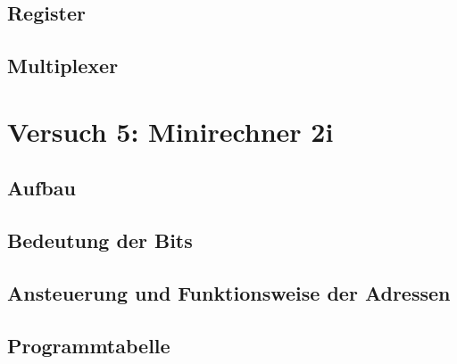 \documentclass[paper=a4, fontsize=11pt]{scrartcl}
\numberwithin{equation}{section}
\numberwithin{figure}{section}
\numberwithin{table}{section}
\begin{document}

\subsection{Register}


\subsection{Multiplexer}


\newpage

\section{Versuch 5: Minirechner 2i}


\subsection{Aufbau}


\subsection{Bedeutung der Bits}


\subsection{Ansteuerung und Funktionsweise der Adressen}


\subsection{Programmtabelle}

\end{document}
